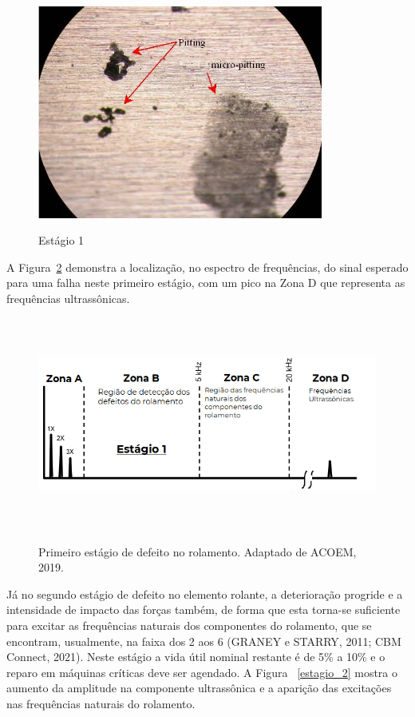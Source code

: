 \documentclass[
	12pt,				
	oneside,			
	a4paper,			
	english,			
	brazil,			
	]{abntex2ppgsi}
\begin{document}
\begin{figure}[H]
\centering
\caption {Estágio 1}
\includegraphics[width=\textwidth,height=70mm,keepaspectratio]{pitting_pista_externa}
\label{pitting_pista_externa}
\end{figure}

A Figura~\ref{estagio_1} demonstra a localização, no espectro de frequências, do sinal esperado para uma falha neste primeiro estágio, com um pico na Zona D que representa as frequências ultrassônicas.  

\begin{figure}[H]
\centering
\caption {Primeiro estágio de defeito no rolamento. Adaptado de ACOEM, 2019.}
\includegraphics[width=\textwidth,height=70mm,keepaspectratio]{estagio_1}
\label{estagio_1}
\end{figure}

Já no segundo estágio de defeito no elemento rolante, a deterioração progride e a intensidade de impacto das forças também, de forma que esta torna-se suficiente para excitar as frequências naturais dos componentes do rolamento, que se encontram, usualmente, na faixa dos \SI{2}{\kilo{\hertz}} aos \SI{6}{\kilo{\hertz}} (GRANEY e STARRY, 2011; CBM Connect, 2021). Neste estágio a vida útil nominal restante é de 5\% a 10\% e o reparo em máquinas críticas deve ser agendado. A Figura ~\ref{estagio_2} mostra o aumento da amplitude na componente ultrassônica e a aparição das excitações nas frequências naturais do rolamento. 
\end{document}
